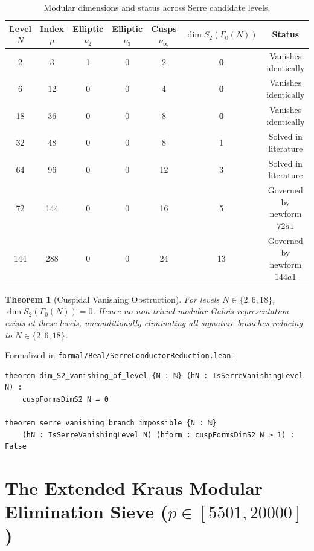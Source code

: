 \documentclass[11pt,reqno]{amsart}
\newtheorem{theorem}{Theorem}[section]
\theoremstyle{definition}
\theoremstyle{remark}
\numberwithin{equation}{section}
\begin{document}
\begin{table}[ht]
\centering
\caption{Modular dimensions and status across Serre candidate levels.}
\label{tab:serre_levels}
\begin{tabular}{ccccccc}
\toprule
Level $N$ & Index $\mu$ & Elliptic $\nu_2$ & Elliptic $\nu_3$ & Cusps $\nu_\infty$ & $\dim S_2(\Gamma_0(N))$ & Status \\
\midrule
2   & 3   & 1 & 0 & 2  & \textbf{0}  & Vanishes identically \\
6   & 12  & 0 & 0 & 4  & \textbf{0}  & Vanishes identically \\
18  & 36  & 0 & 0 & 8  & \textbf{0}  & Vanishes identically \\
32  & 48  & 0 & 0 & 8  & 1           & Solved in literature \cite{Bruin1999} \\
64  & 96  & 0 & 0 & 12 & 3           & Solved in literature \cite{BCDY2015} \\
72  & 144 & 0 & 0 & 16 & 5           & Governed by newform $72a1$ \\
144 & 288 & 0 & 0 & 24 & 13          & Governed by newform $144a1$ \\
\bottomrule
\end{tabular}
\end{table}

\begin{theorem}[Cuspidal Vanishing Obstruction]\label{thm:cusp_vanish}
For levels $N \in \{2, 6, 18\}$, $\dim S_2(\Gamma_0(N)) = 0$. Hence no non-trivial modular Galois representation exists at these levels, unconditionally eliminating all signature branches reducing to $N \in \{2, 6, 18\}$.
\end{theorem}

Formalized in \texttt{formal/Beal/SerreConductorReduction.lean}:
\begin{verbatim}
theorem dim_S2_vanishing_of_level {N : ℕ} (hN : IsSerreVanishingLevel N) :
    cuspFormsDimS2 N = 0

theorem serre_vanishing_branch_impossible {N : ℕ}
    (hN : IsSerreVanishingLevel N) (hform : cuspFormsDimS2 N ≥ 1) : False
\end{verbatim}

\section{The Extended Kraus Modular Elimination Sieve ($p \in [5501, 20000]$)}
\end{document}
